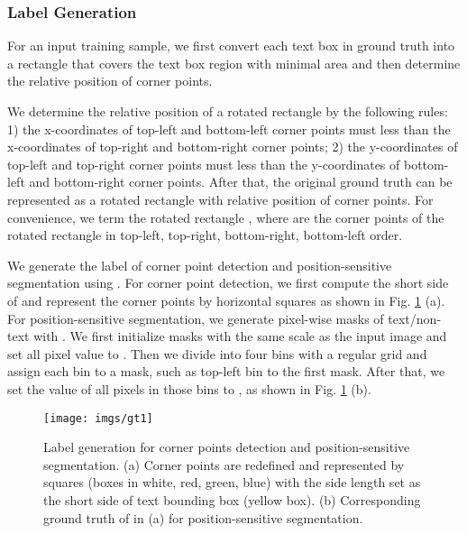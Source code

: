 \documentclass[10pt,twocolumn,letterpaper]{article}
\begin{document}
\subsubsection{Label Generation}
\label{sec_label}


For an input training sample, we first convert each text box in ground truth into a rectangle that covers the text box region with minimal area and then determine the relative position of  corner points.

We determine the relative position of a rotated rectangle by the following rules: 1) the x-coordinates of top-left and bottom-left corner points must less than the x-coordinates of top-right and bottom-right corner points; 2) the y-coordinates of top-left and top-right corner points must less than the y-coordinates of bottom-left and bottom-right corner points.  After that, the original ground truth can  be represented as a rotated rectangle with relative position of corner points. For convenience, we term the rotated rectangle , where  are the corner points of the  rotated rectangle  in top-left, top-right, bottom-right, bottom-left order.  

We generate the label of corner point detection and position-sensitive segmentation using  . For corner point detection, we first compute the short side of  and represent the  corner points by  horizontal squares as shown in Fig. \ref{img_gt} (a).  For position-sensitive segmentation, we generate pixel-wise masks of text/non-text with . We first initialize  masks with the same scale as the input image and set all pixel value to . Then we divide  into four bins with a  regular grid and assign each bin to a mask, such as top-left bin to the first mask. After that, we set the value of  all pixels in those bins to , as shown in Fig. \ref{img_gt} (b).   


\begin{figure}

\begin{centering}
\texttt{[image: imgs/gt1]}
\par\end{centering}
\caption{Label generation for corner points detection and position-sensitive segmentation. (a) Corner points are redefined and represented by  squares (boxes in white, red, green, blue) with the side length set as the short side of text bounding box  (yellow box). (b) Corresponding ground truth of  in (a) for position-sensitive segmentation.}
\label{img_gt}
\end{figure}
\end{document}
